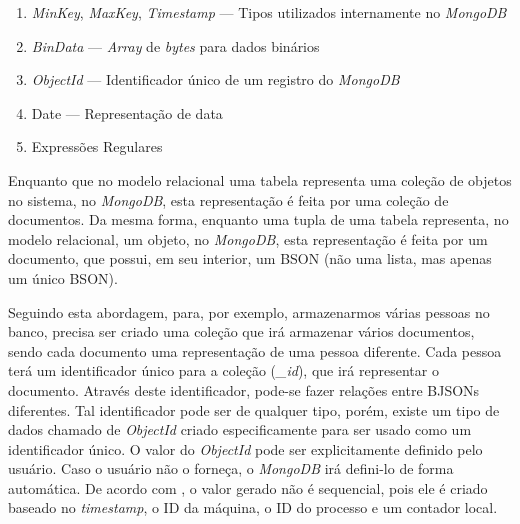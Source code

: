\begin{enumerate}
    \item \textit{MinKey}, \textit{MaxKey}, \textit{Timestamp} --- Tipos utilizados internamente no \textit{MongoDB}

    \item \textit{BinData} --- \textit{Array} de \textit{bytes} para dados binários

    \item \textit{ObjectId} --- Identificador único de um registro do \textit{MongoDB}

    \item Date --- Representação de data
    
    \item Expressões Regulares
\end{enumerate}

Enquanto que no modelo relacional uma tabela representa uma coleção de objetos no sistema, no \textit{MongoDB}, esta representação é feita por uma coleção de documentos. Da mesma forma, enquanto uma tupla de uma tabela representa, no modelo relacional, um objeto, no \textit{MongoDB}, esta representação é feita por um documento, que possui, em seu interior, um BSON (não uma lista, mas apenas um único BSON).
    
Seguindo esta abordagem, para, por exemplo, armazenarmos várias pessoas no banco, precisa ser criado uma coleção que irá armazenar vários documentos, sendo cada documento uma representação de uma pessoa diferente. Cada pessoa terá um identificador único para a coleção (\textit{\_id}), que irá  representar o documento. Através deste identificador, pode-se fazer relações entre BJSONs diferentes. Tal identificador pode ser de qualquer tipo, porém, existe um tipo de dados chamado de \textit{ObjectId} criado especificamente para ser usado como um identificador único. O valor do \textit{ObjectId} pode ser explicitamente definido pelo usuário. Caso o usuário não o forneça, o \textit{MongoDB} irá defini-lo de forma automática. De acordo com , o valor gerado não é sequencial, pois ele é criado baseado no \textit{timestamp}, o ID da máquina, o ID do processo e um contador local.


    
